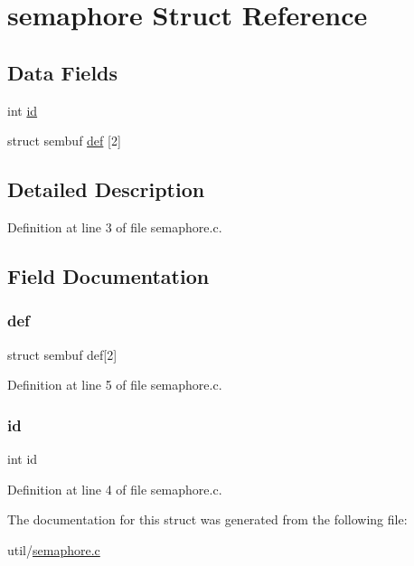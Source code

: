 \hypertarget{structsemaphore}{}\section{semaphore Struct Reference}
\label{structsemaphore}
\subsection*{Data Fields}
\begin{DoxyCompactItemize}
\item 
int \hyperlink{structsemaphore_a7441ef0865bcb3db9b8064dd7375c1ea}{id}
\item 
struct sembuf \hyperlink{structsemaphore_ad6e484da20dc1069154e0a04e1680662}{def} \mbox{[}2\mbox{]}
\end{DoxyCompactItemize}


\subsection{Detailed Description}


Definition at line 3 of file semaphore.\+c.



\subsection{Field Documentation}
\mbox{\label{structsemaphore_ad6e484da20dc1069154e0a04e1680662}} 
\subsubsection{\texorpdfstring{def}{def}}
{\footnotesize\ttfamily struct sembuf def\mbox{[}2\mbox{]}}



Definition at line 5 of file semaphore.\+c.

\mbox{\label{structsemaphore_a7441ef0865bcb3db9b8064dd7375c1ea}} 
\subsubsection{\texorpdfstring{id}{id}}
{\footnotesize\ttfamily int id}



Definition at line 4 of file semaphore.\+c.



The documentation for this struct was generated from the following file\+:\begin{DoxyCompactItemize}
\item 
util/\hyperlink{semaphore_8c}{semaphore.\+c}\end{DoxyCompactItemize}
